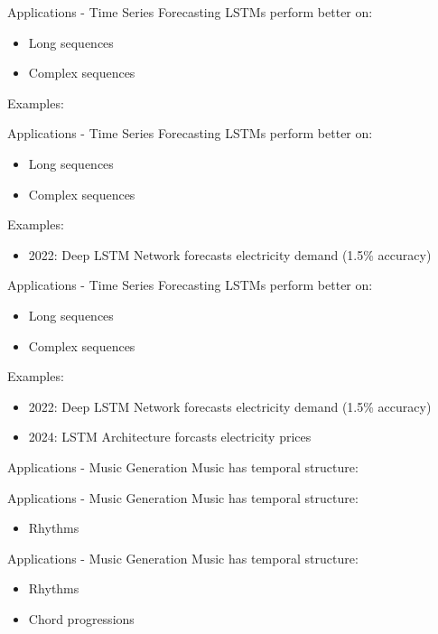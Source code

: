 \documentclass[10pt, aspectratio=169]{beamer}
\begin{document}
\begin{frame}[t]{Applications - Time Series Forecasting}
LSTMs perform better on:
\begin{itemize}
    \item Long sequences
    \item Complex sequences
\end{itemize}
Examples:
\end{frame}

\begin{frame}[t]{Applications - Time Series Forecasting}
LSTMs perform better on:
\begin{itemize}
    \item Long sequences
    \item Complex sequences
\end{itemize}
Examples:
\begin{itemize}
    \item 2022: Deep LSTM Network forecasts electricity demand (1.5\% accuracy)
\end{itemize}
\end{frame}

\begin{frame}[t]{Applications - Time Series Forecasting}
LSTMs perform better on:
\begin{itemize}
    \item Long sequences
    \item Complex sequences
\end{itemize}
Examples:
\begin{itemize}
    \item 2022: Deep LSTM Network forecasts electricity demand (1.5\% accuracy)
    \item 2024: LSTM Architecture forcasts electricity prices 
\end{itemize}
\end{frame}

\begin{frame}[t]{Applications - Music Generation}
Music has temporal structure:
\end{frame}

\begin{frame}[t]{Applications - Music Generation}
Music has temporal structure:
\begin{itemize}
    \item Rhythms
\end{itemize}
\end{frame}

\begin{frame}[t]{Applications - Music Generation}
Music has temporal structure:
\begin{itemize}
    \item Rhythms
    \item Chord progressions
\end{itemize}
\end{frame}
\end{document}
